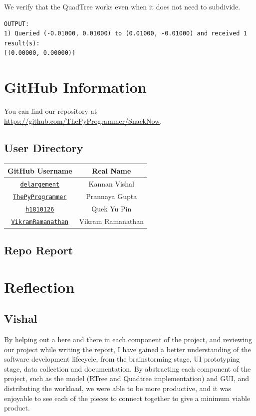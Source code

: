 \documentclass[12pt]{article}
\begin{document}
{We verify that the QuadTree works even when it does not need to subdivide.

\begin{verbatim}
OUTPUT:
1) Queried (-0.01000, 0.01000) to (0.01000, -0.01000) and received 1 result(s):
[(0.00000, 0.00000)]
\end{verbatim}



\newpage
\section{GitHub Information}
You can find our repository at \url{https://github.com/ThePyProgrammer/SnackNow}.

\subsection{User Directory}
\begin{center}
    \begin{tabular}{|c|c|}
        \hline
        GitHub Username & Real Name \\
        \hline
        \href{https://github.com/delargement}{\texttt{delargement}} & Kannan Vishal \\
        \href{https://github.com/ThePyProgrammer}{\texttt{ThePyProgrammer}} & Prannaya Gupta \\
        \href{https://github.com/h1810126}{\texttt{h1810126}} & Quek Yu Pin \\
        \href{https://github.com/VikramRamanathan}{\texttt{VikramRamanathan}} & Vikram Ramanathan \\
        \hline
    \end{tabular}
\end{center}


\subsection{Repo Report}

\section{Reflection}

\subsection{Vishal}

By helping out a here and there in each component of the project, and reviewing our project while writing the report, I have gained a better understanding of the software development lifecycle, from the brainstorming stage, UI prototyping stage, data collection and documentation. By abstracting each component of the project, such as the model (RTree and Quadtree implementation) and GUI, and distributing the workload, we were able to be more productive, and it was enjoyable to see each of the pieces to connect together to give a minimum viable product.

}
\end{document}
